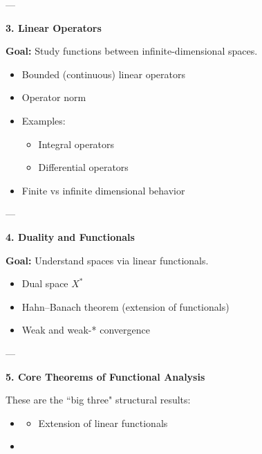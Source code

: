 \documentclass[12pt,a4paper]{report}
\begin{document}
\begin{description}
---

\item \textbf{3. Linear Operators}

\item \textbf{Goal:} Study functions between infinite-dimensional spaces.

\begin{itemize}
    \item Bounded (continuous) linear operators

    \item Operator norm

    \item Examples:

	\begin{itemize}
        \item Integral operators
        \item Differential operators
	\end{itemize}

    \item Finite vs infinite dimensional behavior
\end{itemize}

---

\item \textbf{4. Duality and Functionals}

\item \textbf{Goal:} Understand spaces via linear functionals.

\begin{itemize}
    \item Dual space $ X^* $
    \item Hahn–Banach theorem (extension of functionals)
    \item Weak and weak-* convergence
\end{itemize}

---

\item \textbf{5. Core Theorems of Functional Analysis}

These are the ``big three" structural results:

\begin{itemize}
    \item {}

	\begin{itemize}
        \item Extension of linear functionals
	\end{itemize}
    \item {}


\end{itemize}
\end{description}
\end{document}
